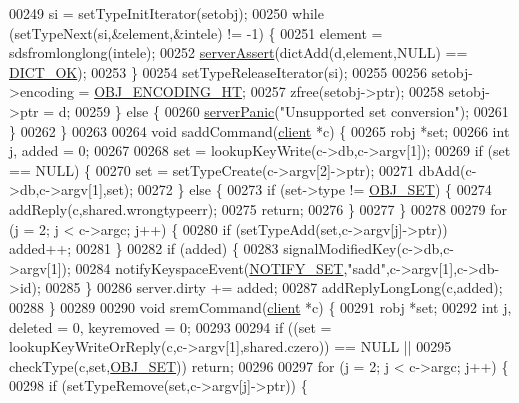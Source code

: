 \begin{DoxyCode}
00249         si = setTypeInitIterator(setobj);
00250         \textcolor{keywordflow}{while} (setTypeNext(si,&element,&intele) != -1) \{
00251             element = sdsfromlonglong(intele);
00252             \hyperlink{server_8h_a88114b5169b4c382df6b56506285e56a}{serverAssert}(dictAdd(d,element,NULL) == \hyperlink{dict_8h_a2afecbeab8f7efbc183048f52f6d17e5}{DICT\_OK});
00253         \}
00254         setTypeReleaseIterator(si);
00255 
00256         setobj->encoding = \hyperlink{server_8h_a9c10219f68afc557d510d108257d238b}{OBJ\_ENCODING\_HT};
00257         zfree(setobj->ptr);
00258         setobj->ptr = d;
00259     \} \textcolor{keywordflow}{else} \{
00260         \hyperlink{server_8h_a11cc378e7778a830b41240578de3b204}{serverPanic}(\textcolor{stringliteral}{"Unsupported set conversion"});
00261     \}
00262 \}
00263 
00264 \textcolor{keywordtype}{void} saddCommand(\hyperlink{structclient}{client} *c) \{
00265     robj *set;
00266     \textcolor{keywordtype}{int} j, added = 0;
00267 
00268     set = lookupKeyWrite(c->db,c->argv[1]);
00269     \textcolor{keywordflow}{if} (set == NULL) \{
00270         set = setTypeCreate(c->argv[2]->ptr);
00271         dbAdd(c->db,c->argv[1],set);
00272     \} \textcolor{keywordflow}{else} \{
00273         \textcolor{keywordflow}{if} (set->type != \hyperlink{server_8h_a8d179375a4aac33d3fa7aa80c8ccc75f}{OBJ\_SET}) \{
00274             addReply(c,shared.wrongtypeerr);
00275             \textcolor{keywordflow}{return};
00276         \}
00277     \}
00278 
00279     \textcolor{keywordflow}{for} (j = 2; j < c->argc; j++) \{
00280         \textcolor{keywordflow}{if} (setTypeAdd(set,c->argv[j]->ptr)) added++;
00281     \}
00282     \textcolor{keywordflow}{if} (added) \{
00283         signalModifiedKey(c->db,c->argv[1]);
00284         notifyKeyspaceEvent(\hyperlink{server_8h_a625aec945b2152a46979b1b21f2af274}{NOTIFY\_SET},\textcolor{stringliteral}{"sadd"},c->argv[1],c->db->id);
00285     \}
00286     server.dirty += added;
00287     addReplyLongLong(c,added);
00288 \}
00289 
00290 \textcolor{keywordtype}{void} sremCommand(\hyperlink{structclient}{client} *c) \{
00291     robj *set;
00292     \textcolor{keywordtype}{int} j, deleted = 0, keyremoved = 0;
00293 
00294     \textcolor{keywordflow}{if} ((set = lookupKeyWriteOrReply(c,c->argv[1],shared.czero)) == NULL ||
00295         checkType(c,set,\hyperlink{server_8h_a8d179375a4aac33d3fa7aa80c8ccc75f}{OBJ\_SET})) \textcolor{keywordflow}{return};
00296 
00297     \textcolor{keywordflow}{for} (j = 2; j < c->argc; j++) \{
00298         \textcolor{keywordflow}{if} (setTypeRemove(set,c->argv[j]->ptr)) \{

\end{DoxyCode}
